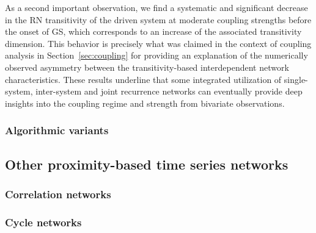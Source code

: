 As a second important observation, we find a systematic and significant decrease in the RN transitivity of the driven system at moderate coupling strengths before the onset of GS, which corresponds to an increase of the associated transitivity dimension. This behavior is precisely what was claimed in the context of coupling analysis in Section~\ref{sec:coupling} for providing an explanation of the numerically observed asymmetry between the transitivity-based interdependent network characteristics. These results underline that some integrated utilization of single-system, inter-system and joint recurrence networks can eventually provide deep insights into the coupling regime and strength from bivariate observations.





\subsubsection{Algorithmic variants}

	\subsection{Other proximity-based time series networks}
		\subsubsection{Correlation networks}
		\subsubsection{Cycle networks}
